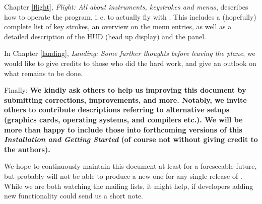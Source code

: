 Chapter \ref{flight}, \textit{Flight: All about instruments, keystrokes and menus},
describes how to operate the program, i.\,e. to actually fly with
\FlightGear\hspace{-1mm}. This includes a (hopefully) complete list of key strokes, an
overview on the menu entries, as well as a detailed description of the HUD (head up
display) and the panel.

In Chapter \ref{landing}, \textit{Landing: Some further thoughts before leaving the
plane}, we would like to give credits to those who did the hard work, and give an outlook
on what remains to be done.

Finally: \textbf{We kindly ask others to help us improving this document by submitting
corrections, improvements, and more. Notably, we invite others to contribute descriptions
referring to alternative setups (graphics cards, operating systems, and compilers etc.).
We will be more than happy to include those into forthcoming versions of this
\textit{Installation and Getting Started} (of course not without giving credit to the
authors).}

We hope to continuously maintain this document at least for a foreseeable future, but
probably will not be able to produce a new one for any single release of {\FlightGear}.
While we are both watching the mailing lists, it might help, if developers adding new
functionality could send us a short note.



